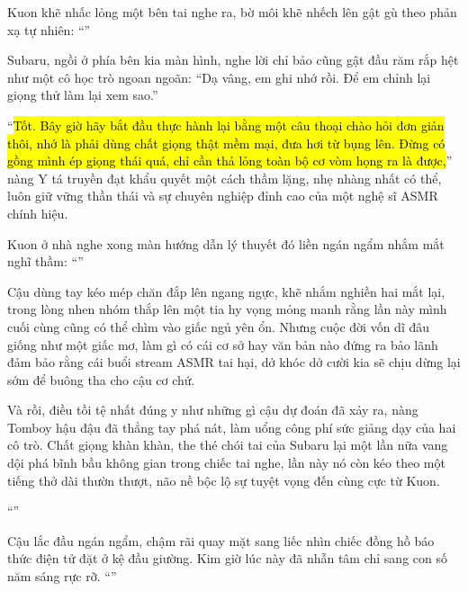 \documentclass[../main.tex]{subfiles}
\begin{document}
Kuon khẽ nhấc lỏng một bên tai nghe ra, bờ môi khẽ nhếch lên gật gù theo phản xạ tự nhiên: ``\textit{}''

\il

Subaru, ngồi ở phía bên kia màn hình, nghe lời chỉ bảo cũng gật đầu răm rắp hệt như một cô học trò ngoan ngoãn: ``Dạ vâng, em ghi nhớ rồi. Để em chỉnh lại giọng thử làm lại xem sao.''

``\hl{Tốt. Bây giờ hãy bắt đầu thực hành lại bằng một câu thoại chào hỏi đơn giản thôi, nhớ là phải dùng chất giọng thật mềm mại, đưa hơi từ bụng lên. Đừng có gồng mình ép giọng thái quá, chỉ cần thả lỏng toàn bộ cơ vòm họng ra là được,}'' nàng Y tá truyền đạt khẩu quyết một cách thầm lặng, nhẹ nhàng nhất có thể, luôn giữ vững thần thái và sự chuyên nghiệp đỉnh cao của một nghệ sĩ ASMR chính hiệu.

\il

Kuon ở nhà nghe xong màn hướng dẫn lý thuyết đó liền ngán ngẩm nhắm mắt nghĩ thầm: ``\textit{}''

Cậu dùng tay kéo mép chăn đắp lên ngang ngực, khẽ nhắm nghiền hai mắt lại, trong lòng nhen nhóm thắp lên một tia hy vọng mỏng manh rằng lần này mình cuối cùng cũng có thể chìm vào giấc ngủ yên ổn. Nhưng cuộc đời vốn dĩ đâu giống như một giấc mơ, làm gì có cái cơ sở hay văn bản nào đứng ra bảo lãnh đảm bảo rằng cái buổi stream ASMR tai hại, dở khóc dở cười kia sẽ chịu dừng lại sớm để buông tha cho cậu cơ chứ.

Và rồi, điều tồi tệ nhất đúng y như những gì cậu dự đoán đã xảy ra, nàng Tomboy hậu đậu đã thẳng tay phá nát, làm uổng công phí sức giảng dạy của hai cô trò. Chất giọng khàn khàn, the thé chói tai của Subaru lại một lần nữa vang dội phá bĩnh bầu không gian trong chiếc tai nghe, lần này nó còn kéo theo một tiếng thở dài thườn thượt, não nề bộc lộ sự tuyệt vọng đến cùng cực từ Kuon.

``\textit{}''

Cậu lắc đầu ngán ngẩm, chậm rãi quay mặt sang liếc nhìn chiếc đồng hồ báo thức điện tử đặt ở kệ đầu giường. Kim giờ lúc này đã nhẫn tâm chỉ sang con số năm sáng rực rỡ. ``\textit{}''
\end{document}

